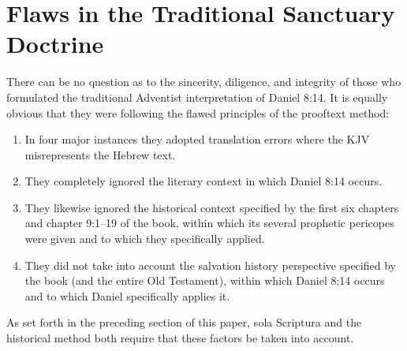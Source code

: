 \chapter{Flaws in the Traditional Sanctuary Doctrine}
\label{ch:flaws}

There can be no question as to the sincerity, diligence, and integrity of
those who formulated the traditional Adventist interpretation of
Daniel 8:14. It is equally obvious that they were following the flawed
principles of the prooftext method:
\begin{enumerate}
	\item In four major instances they adopted
translation errors where the KJV misrepresents the Hebrew text. 
	\item They
completely ignored the literary context in which Daniel 8:14 occurs.
	\item They likewise ignored the historical context specified by the first six
chapters and chapter 9:1--19 of the book, within which its several prophetic
pericopes were given and to which they specifically applied.
	\item They did not take into account the salvation history perspective 
specified by the 
book (and the entire Old Testament), within which Daniel 8:14 occurs and
to which Daniel specifically applies it.
\end{enumerate}
As set forth in the preceding
section of this paper, sola Scriptura and the historical method both require
that these factors be taken into account.

